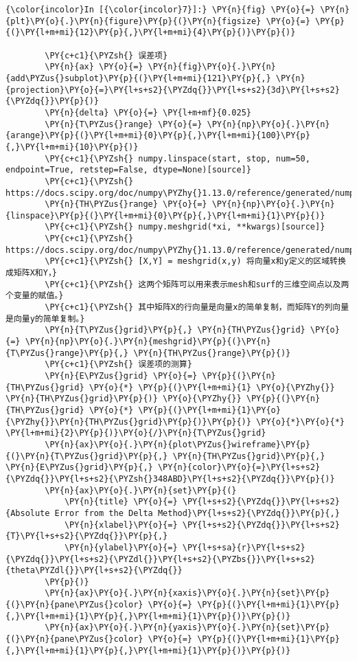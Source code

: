     \begin{Verbatim}[commandchars=\\\{\}]
{\color{incolor}In [{\color{incolor}7}]:} \PY{n}{fig} \PY{o}{=} \PY{n}{plt}\PY{o}{.}\PY{n}{figure}\PY{p}{(}\PY{n}{figsize} \PY{o}{=} \PY{p}{(}\PY{l+m+mi}{12}\PY{p}{,}\PY{l+m+mi}{4}\PY{p}{)}\PY{p}{)}

        \PY{c+c1}{\PYZsh{} 误差项}
        \PY{n}{ax} \PY{o}{=} \PY{n}{fig}\PY{o}{.}\PY{n}{add\PYZus{}subplot}\PY{p}{(}\PY{l+m+mi}{121}\PY{p}{,} \PY{n}{projection}\PY{o}{=}\PY{l+s+s2}{\PYZdq{}}\PY{l+s+s2}{3d}\PY{l+s+s2}{\PYZdq{}}\PY{p}{)}
        \PY{n}{delta} \PY{o}{=} \PY{l+m+mf}{0.025}
        \PY{n}{T\PYZus{}range} \PY{o}{=} \PY{n}{np}\PY{o}{.}\PY{n}{arange}\PY{p}{(}\PY{l+m+mi}{0}\PY{p}{,}\PY{l+m+mi}{100}\PY{p}{,}\PY{l+m+mi}{10}\PY{p}{)}
        \PY{c+c1}{\PYZsh{} numpy.linspace(start, stop, num=50, endpoint=True, retstep=False, dtype=None)[source]}
        \PY{c+c1}{\PYZsh{} https://docs.scipy.org/doc/numpy\PYZhy{}1.13.0/reference/generated/numpy.linspace.html}
        \PY{n}{TH\PYZus{}range} \PY{o}{=} \PY{n}{np}\PY{o}{.}\PY{n}{linspace}\PY{p}{(}\PY{l+m+mi}{0}\PY{p}{,}\PY{l+m+mi}{1}\PY{p}{)}
        \PY{c+c1}{\PYZsh{} numpy.meshgrid(*xi, **kwargs)[source]}
        \PY{c+c1}{\PYZsh{} https://docs.scipy.org/doc/numpy\PYZhy{}1.13.0/reference/generated/numpy.meshgrid.html}
        \PY{c+c1}{\PYZsh{} [X,Y] = meshgrid(x,y) 将向量x和y定义的区域转换成矩阵X和Y，}
        \PY{c+c1}{\PYZsh{} 这两个矩阵可以用来表示mesh和surf的三维空间点以及两个变量的赋值。}
        \PY{c+c1}{\PYZsh{} 其中矩阵X的行向量是向量x的简单复制，而矩阵Y的列向量是向量y的简单复制。}
        \PY{n}{T\PYZus{}grid}\PY{p}{,} \PY{n}{TH\PYZus{}grid} \PY{o}{=} \PY{n}{np}\PY{o}{.}\PY{n}{meshgrid}\PY{p}{(}\PY{n}{T\PYZus{}range}\PY{p}{,} \PY{n}{TH\PYZus{}range}\PY{p}{)}
        \PY{c+c1}{\PYZsh{} 误差项的测算}
        \PY{n}{E\PYZus{}grid} \PY{o}{=} \PY{p}{(}\PY{n}{TH\PYZus{}grid} \PY{o}{*} \PY{p}{(}\PY{l+m+mi}{1} \PY{o}{\PYZhy{}} \PY{n}{TH\PYZus{}grid}\PY{p}{)} \PY{o}{\PYZhy{}} \PY{p}{(}\PY{n}{TH\PYZus{}grid} \PY{o}{*} \PY{p}{(}\PY{l+m+mi}{1}\PY{o}{\PYZhy{}}\PY{n}{TH\PYZus{}grid}\PY{p}{)}\PY{p}{)} \PY{o}{*}\PY{o}{*} \PY{l+m+mi}{2}\PY{p}{)}\PY{o}{/}\PY{n}{T\PYZus{}grid}
        \PY{n}{ax}\PY{o}{.}\PY{n}{plot\PYZus{}wireframe}\PY{p}{(}\PY{n}{T\PYZus{}grid}\PY{p}{,} \PY{n}{TH\PYZus{}grid}\PY{p}{,} \PY{n}{E\PYZus{}grid}\PY{p}{,} \PY{n}{color}\PY{o}{=}\PY{l+s+s2}{\PYZdq{}}\PY{l+s+s2}{\PYZsh{}348ABD}\PY{l+s+s2}{\PYZdq{}}\PY{p}{)}
        \PY{n}{ax}\PY{o}{.}\PY{n}{set}\PY{p}{(}
            \PY{n}{title} \PY{o}{=} \PY{l+s+s2}{\PYZdq{}}\PY{l+s+s2}{Absolute Error from the Delta Method}\PY{l+s+s2}{\PYZdq{}}\PY{p}{,}
            \PY{n}{xlabel}\PY{o}{=} \PY{l+s+s2}{\PYZdq{}}\PY{l+s+s2}{T}\PY{l+s+s2}{\PYZdq{}}\PY{p}{,}
            \PY{n}{ylabel}\PY{o}{=} \PY{l+s+sa}{r}\PY{l+s+s2}{\PYZdq{}}\PY{l+s+s2}{\PYZdl{}}\PY{l+s+s2}{\PYZbs{}}\PY{l+s+s2}{theta\PYZdl{}}\PY{l+s+s2}{\PYZdq{}}
        \PY{p}{)}
        \PY{n}{ax}\PY{o}{.}\PY{n}{xaxis}\PY{o}{.}\PY{n}{set}\PY{p}{(}\PY{n}{pane\PYZus{}color} \PY{o}{=} \PY{p}{(}\PY{l+m+mi}{1}\PY{p}{,}\PY{l+m+mi}{1}\PY{p}{,}\PY{l+m+mi}{1}\PY{p}{)}\PY{p}{)}
        \PY{n}{ax}\PY{o}{.}\PY{n}{yaxis}\PY{o}{.}\PY{n}{set}\PY{p}{(}\PY{n}{pane\PYZus{}color} \PY{o}{=} \PY{p}{(}\PY{l+m+mi}{1}\PY{p}{,}\PY{l+m+mi}{1}\PY{p}{,}\PY{l+m+mi}{1}\PY{p}{)}\PY{p}{)}


\end{Verbatim}

